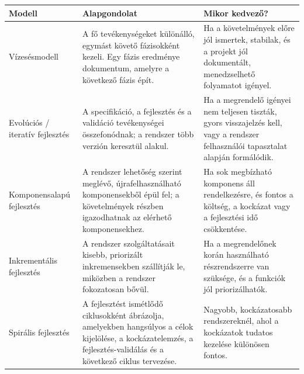 \begin{tabularx}{\textwidth}{L{29mm}X X}
\toprule
\textbf{Modell} & \textbf{Alapgondolat} & \textbf{Mikor kedvező?} \\
\midrule
Vízesésmodell & A fő tevékenységeket különálló, egymást követő fázisokként kezeli. Egy fázis eredménye dokumentum, amelyre a következő fázis épít. & Ha a követelmények előre jól ismertek, stabilak, és a projekt jól dokumentált, menedzselhető folyamatot igényel. \\
Evolúciós / iteratív fejlesztés & A specifikáció, a fejlesztés és a validáció tevékenységei összefonódnak; a rendszer több verzión keresztül alakul. & Ha a megrendelő igényei nem teljesen tiszták, gyors visszajelzés kell, vagy a rendszer felhasználói tapasztalat alapján formálódik. \\
Komponensalapú fejlesztés & A rendszer lehetőség szerint meglévő, újrafelhasználható komponensekből épül fel; a követelmények részben igazodhatnak az elérhető komponensekhez. & Ha sok megbízható komponens áll rendelkezésre, és fontos a költség, a kockázat vagy a fejlesztési idő csökkentése. \\
Inkrementális fejlesztés & A rendszer szolgáltatásait kisebb, priorizált inkremensekben szállítják le, miközben a rendszer fokozatosan bővül. & Ha a megrendelőnek korán használható részrendszerre van szüksége, és a funkciók jól priorizálhatók. \\
Spirális fejlesztés & A fejlesztést ismétlődő ciklusokként ábrázolja, amelyekben hangsúlyos a célok kijelölése, a kockázatelemzés, a fejlesztés-validálás és a következő ciklus tervezése. & Nagyobb, kockázatosabb rendszereknél, ahol a kockázatok tudatos kezelése különösen fontos. \\
\bottomrule
\end{tabularx}
